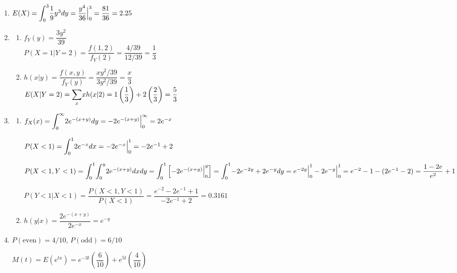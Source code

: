 \documentclass{article}
\newcommand\mfrac[2]{\left(\dfrac{#1}{#2}\right)}
\newcommand\lint{\mathlarger{\int}}
\newcommand\lsum{\mathlarger{\sum}}
\begin{document}
\begin{enumerate}
     \item
      $E(X) = \lint_0^3 {\dfrac{1}{9}y^3 dy} = \dfrac{y^4}{36}\Big|_0^3 = \dfrac{81}{36} = 2.25$
     
     \item
      \begin{enumerate}
       \item 
	$f_Y(y) = \dfrac{3y^2}{39}$ \\	
	$P(X=1|Y=2) = \dfrac{f(1,2)}{f_Y(2)} = \dfrac{4/39}{12/39} = \dfrac{1}{3}$
       
       \item
	$h(x|y) = \dfrac{f(x,y)}{f_Y(y)} = \dfrac{xy^2/39}{3y^2/39} = \dfrac{x}{3}$ \\
	$E(X|Y=2) = \lsum_x{x h(x|2)} = 1\mfrac{1}{3} + 2\mfrac{2}{3} = \dfrac{5}{3}$
      \end{enumerate}
     
     \item
      \begin{enumerate}
       \item 
	$f_X(x) = \lint_0^\infty {2e^{-(x+y)} dy} = -2e^{-(x+y)}\Big|_0^\infty = 2e^{-x}$
	
	$P(X < 1) = \lint_0^1 {2e^{-x}dx} = -2e^{-x}\Big|_0^1 = -2e^{-1} + 2$
	
	$P(X<1, Y<1) = \lint_0^1 \lint_0^y { 2e^{-(x+y)} dx dy} 
	  = \lint_0^1 \left[-2e^{-(x+y)}\Big|_0^y \right] = \lint_0^1 {-2e^{-2y} + 2e^{-y} dy} \\
	  = e^{-2y}\Big|_0^1 - 2e^{-y}\Big|_0^1 = e^{-2} - 1 - (2e^{-1} - 2) = \dfrac{1 - 2e}{e^2}+1$
	  
	$P(Y<1 | X < 1) = \dfrac{P(X<1, Y<1)}{P(X<1)} = \dfrac{e^{-2}-2e^{-1}+1}{-2e^{-1}+2} 
	  = 0.3161$
       
       \item
	$h(y|x) = \dfrac{2e^{-(x+y)}}{2e^{-x}} = e^{-y}$
      \end{enumerate}
     
     \item
      $P(\text{even}) = 4/10$, $P(\text{odd}) = 6/10$
      
      $M(t) = E(e^{tx}) = e^{-3t}\mfrac{6}{10} + e^{5t}\mfrac{4}{10}$
    \end{enumerate}
\end{document}
